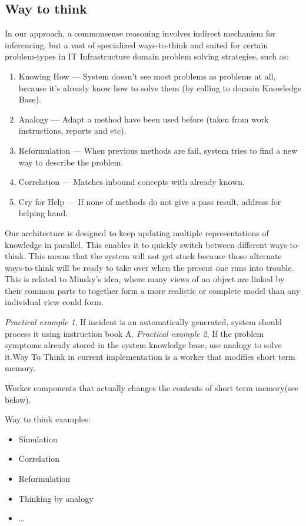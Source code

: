 \documentclass[runningheads,a4paper]{llncs}
\begin{document}
\subsection{Way to think}
In our approach, a commonsense reasoning involves indirect mechanism for inferencing, but a vast of  specialized ways-to-think and suited for certain problem-types in IT Infrastructure domain problem solving strategies, such as:
\begin{enumerate}
 \item Knowing How — System doesn’t see most problems as problems at all, because it’s already know how to solve them (by calling to domain Knowledge Base).
 \item Analogy — Adapt a method have been used before (taken from work instructions, reports  and etc).
 \item Reformulation — When previous methods are fail, system tries to find a new way to describe the problem.
 \item Correlation — Matches inbound concepts with already known.
 \item Cry for Help — If none of  methods do not give a pass result, address for helping hand.
\end{enumerate}
Our architecture is designed to keep updating multiple representations of knowledge in parallel. This enables it to quickly switch between different ways-to-think. This means that the system will not get stuck because those alternate ways-to-think will be ready to take over when the present one runs into trouble. This is related to Minsky’s idea, where many views of an object are linked by their common parts to together form a more realistic or complete model than any individual view could form.

\emph{Practical example 1}, If incident is an automatically generated, system should process it using instruction book A.
\emph{Practical example 2}, If the problem symptoms already stored in the system knowledge base, use analogy to solve it.Way To Think in current implementation is a worker that modifies short term memory.

Worker components that actually changes the contents of short term memory(see below).

Way to think examples:
\begin{itemize}
 \item Simulation
 \item Correlation
 \item Reformulation
 \item Thinking by analogy
 \item …
\end{itemize}
\end{document}
